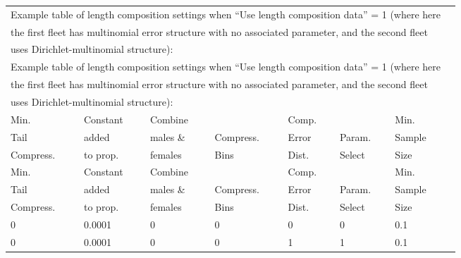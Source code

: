 \begin{tabular}{p{2cm} p{2cm} p{2cm} p{2cm} p{2cm} p{2cm} p{1.5cm} p{1.7cm}}
	\multicolumn{7}{l}{Example table of length composition settings when ``Use length composition data'' = 1 (where here} \\
	\multicolumn{7}{l}{the first fleet has multinomial error structure with no associated parameter, and the second fleet} \\ 
	\multicolumn{7}{l}{uses Dirichlet-multinomial structure):} \\
	\multicolumn{7}{l}{Example table of length composition settings when ``Use length composition data'' = 1 (where here} \\
	\multicolumn{7}{l}{the first fleet has multinomial error structure with no associated parameter, and the second fleet} \\ 
	\multicolumn{7}{l}{uses Dirichlet-multinomial structure):} \\
	\hline
	Min.      & Constant & Combine   &           & Comp. &           & Min. \Tstrut\\
	Tail      & added    & males \&  & Compress. & Error & Param.    & Sample \\
	Compress. & to prop. & females   & Bins      & Dist. & Select    & Size \Bstrut\\
	Min.      & Constant & Combine   &           & Comp. &           & Min. \Tstrut\\
	Tail      & added    & males \&  & Compress. & Error & Param.    & Sample \\
	Compress. & to prop. & females   & Bins      & Dist. & Select    & Size \Bstrut\\
	\hline
	0 & 0.0001 & 0 & 0 & 0 & 0 & 0.1 \Tstrut\\
	0 & 0.0001 & 0 & 0 & 1 & 1 & 0.1 \Bstrut\\
	\hline
\end{tabular}


